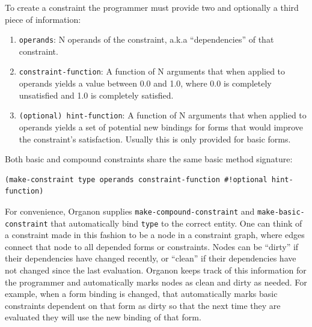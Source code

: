 \documentclass[12pt,a4paper]{article}
\begin{document}
To create a constraint the programmer must provide two and optionally a third piece of information:
\begin{enumerate}

\item \texttt{operands}: N operands of the constraint, a.k.a ``dependencies'' of that constraint.
\item \texttt{constraint-function}: A function of N arguments that when applied to operands yields a value between 0.0 and 1.0, where 0.0 is completely unsatisfied and 1.0 is completely satisfied.
\item \texttt{(optional) hint-function}:  A function of N arguments that when applied to operands yields a set of potential new bindings for forms that would improve the constraint's satisfaction.  Usually this is only provided for basic forms.

\end{enumerate}
Both basic and compound constraints share the same basic method signature:
\begin{lstlisting}
(make-constraint type operands constraint-function #!optional hint-function)

\end{lstlisting}
For convenience, Organon supplies \texttt{make-compound-constraint} and \texttt{make-basic-constraint} that automatically bind \texttt{type} to the correct entity. One can think of a constraint made in this fashion to be a node in a constraint graph, where edges connect that node to all depended forms or constraints.  Nodes can be ``dirty'' if their dependencies have changed recently, or ``clean'' if their dependencies have not changed since the last evaluation.  Organon keeps track of this information for the programmer and automatically marks nodes as clean and dirty as needed.  For example, when a form binding is changed, that automatically marks basic constraints dependent on that form as dirty so that the next time they are evaluated they will use the new binding of that form.
\end{document}
